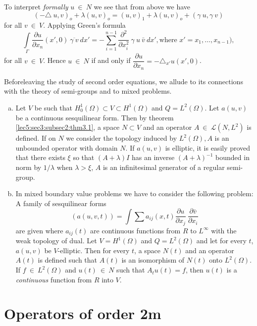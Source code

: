 To interpret \textit{formally} $u ~ \in ~ N$ we see that from
above we have 
$$
(- \triangle ~ u,v)_o + \lambda (u,v)_o = (u,v)_1 + \lambda(u,v)_o +
(\gamma ~ u, \gamma ~ v) 
$$
for all $v ~ \in ~ V$. Applying Green's formula
$$
\int\limits_\Gamma \frac{\partial u}{\partial x_n} (x', 0) ~
\overline{\gamma ~v} ~ dx' = - \sum_{i=1}^{n-1}
\frac{\partial^2}{\partial x^2_i} ~ \gamma ~ u ~ \bar{v} ~ dx', \text{
  where } x' = x_1,\ldots, x_{n-1}), 
$$
for all $v ~ \in ~ V$. Hence $u ~ \in ~ N$ if and only
if $ \dfrac{\partial u}{\partial x_n} = - \triangle_{x'} u(x',0)$. 

Before\pageoriginale leaving the study of second order equations, we allude to its
connections with the theory of semi-groups and to mixed problems.  
\begin{enumerate}[a)]
\item Let $V$ be such that $H^1_0(\Omega) \subset V \subset
  H^1(\Omega)$ and $Q = L^2(\Omega)$. Let $a(u,v)$ be a continuous
  sesquilinear form. Then by theorem \ref{lec5:sec3:subsec2:thm3.1}, a space $N \subset V$ and
  an operator $A ~ \in ~ \mathscr{L} (N,L^2)$ is defined. If
  on $N$ we consider the topology induced by $L^2(\Omega), A$ is an
  unbounded operator with domain $N$. If $a(u,v)$ is elliptic, it is
  easily proved that there exists $\xi$ so that $(A + \lambda)I$ has
  an inverse $(A + \lambda)^{-1}$ bounded in norm by $1/\lambda$ when
  $\lambda > \xi$, $A$ is an infinitesimal generator of a regular
  semi-group. 
\item In mixed boundary value problems we have to consider the
  following problem: A family of sesquilinear forms 
$$
(a(u,v,t)) = \int \sum a_{ij} (x,t) \frac{\partial u}{\partial x_j} ~
  \frac{\partial \bar{v}}{\partial x_i} 
$$
are given where $a_{ij}(t)$ are continuous functions from $R$ to
$L^\infty$ with the weak topology of dual. Let $V = H^1 (\Omega)$ and
$Q = L^2(\Omega)$ and let for every $t$, $a(u,v)$ be $V$-elliptic. Then
for every $t$, a space $N(t)$ and an operator $A(t)$ is defined such
that $A(t)$ is an isomorphism of $N(t)$ onto $L^2(\Omega)$. If $f ~
\in ~ L^2 (\Omega)$ and $u(t) ~ \in ~ N$ such that
$A_t u(t) = f$, then $u(t)$ is a \textit{continuous} function from $R$
into $V$.  
\end{enumerate}

\section{Operators of order 2m}\label{lec12:sec7}%

